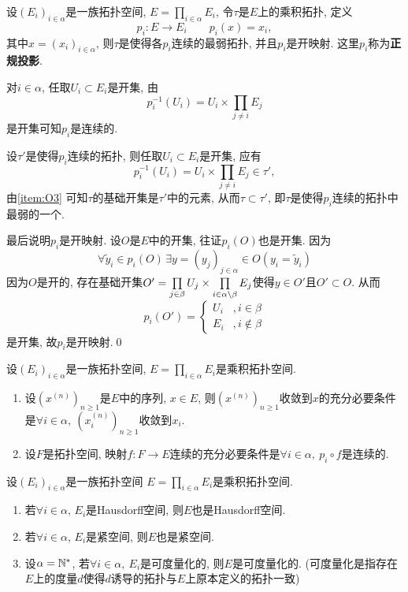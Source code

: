 	\begin{Theorem}
	设$ (E_i)_{i\in\alpha} $是一族拓扑空间, $ E=\prod_{i\in\alpha}E_i $, 令$ \tau $是$ E $上的乘积拓扑, 定义
	\[
	p_i : E\to E_i\qquad p_i(x)=x_i,
	\]
	其中$ x=(x_i)_{i\in\alpha} $, 则$ \tau $是使得各$ p_i $连续的最弱拓扑, 并且$ p_i $是开映射. 这里$ p_i $称为\textbf{正规投影}.
	\end{Theorem}
	\begin{Proof}
	对$ i\in\alpha $, 任取$ U_i\subset E_i $是开集, 由
	\[
	p_i^{-1}(U_i)=U_i\times\prod_{j\ne i}E_j
	\]
	是开集可知$ p_i $是连续的.
	
	设$ \tau' $是使得$ p_i $连续的拓扑, 则任取$ U_i\subset E_i $是开集, 应有
	\[
	p_i^{-1}(U_i)=U_i\times\prod_{j\ne i}E_j\in\tau',
	\]
	由\ref{item:O3} 可知$ \tau $的基础开集是$ \tau' $中的元素, 从而$ \tau\subset\tau' $, 即$ \tau $是使得$ p_i $连续的拓扑中最弱的一个.
	
	最后说明$ p_i $是开映射. 设$ O $是$ E $中的开集, 往证$ p_i(O) $也是开集. 因为
	\[
	\forall \tilde{y}_i\in p_i(O)\,\exists y=(y_j)_{j\in\alpha}\in O(y_i=\tilde{y}_i)
	\]
	因为$ O $是开的, 存在基础开集$ O'=\prod\limits_{j\in\beta}U_j\times\prod\limits_{i\in\alpha\setminus\beta}E_j $使得$ y\in O' $且$ O'\subset O $. 从而
	\[
	p_i(O')=\begin{cases}
	U_i & ,i\in\beta\\ E_i &, i\notin\beta
	\end{cases}
	\]
	是开集, 故$ p_i $是开映射.\qed
	\end{Proof}
	
	\begin{Corollary}
	设$ (E_i)_{i\in\alpha} $是一族拓扑空间, $ E=\prod\limits_{i\in\alpha}E_i $是乘积拓扑空间.
	\begin{enumerate}[(1)]
	\item 设$ (x^{(n)})_{n\geqslant 1} $是$ E $中的序列, $ x\in E $, 则$ (x^{(n)})_{n\geqslant 1} $收敛到$ x $的充分必要条件是$\forall i\in\alpha,\  (x_i^{(n)})_{n\geqslant 1} $收敛到$ x_i $.
	
	\item 设$ F $是拓扑空间, 映射$ f : F\to E $连续的充分必要条件是$ \forall i\in\alpha,\ p_i\circ f $是连续的.
	\end{enumerate}
	\end{Corollary}
	
	\begin{Proposition}\label{prop:乘积拓扑空间的继承性质}
	设$ (E_i)_{i\in\alpha} $是一族拓扑空间 $ E=\prod\limits_{i\in\alpha}E_i $是乘积拓扑空间.
	\begin{enumerate}[(1)]
	\item 若$ \forall i\in\alpha $, $ E_i $是Hausdorff空间, 则$ E $也是Hausdorff空间.
	
	\item 若$ \forall i\in\alpha $, $ E_i $是紧空间, 则$ E $也是紧空间.
	
	\item 设$ \alpha=\mathbb{N}^\ast $, 若$ \forall i\in\alpha,\ E_i $是可度量化的, 则$ E $是可度量化的. (可度量化是指存在$ E $上的度量$ d $使得$ d $诱导的拓扑与$ E $上原本定义的拓扑一致)
	\end{enumerate}
	\end{Proposition}
	

